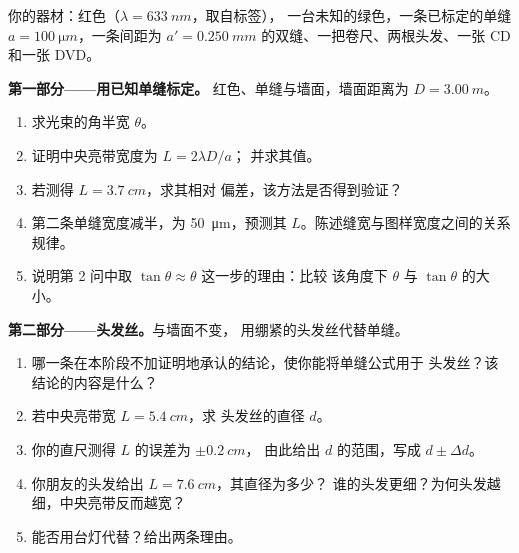 \begin{problem}
\label{pb:g12:light-as-wave:1}
你的器材：红色（$\lambda = \qty{633}{nm}$，取自标签），
一台未知的绿色，一条已标定的单缝
$a = \qty{100}{\micro m}$，一条间距为 $a' =
\qty{0.250}{mm}$ 的双缝、一把卷尺、两根头发、一张 CD 和一张 DVD。

\medskip
\noindent\textbf{第一部分——用已知单缝标定。}
红色、单缝与墙面，墙面距离为 $D = \qty{3.00}{m}$。
\begin{enumerate}
  \item 求光束的角半宽 $\theta$。
  \item 证明中央亮带宽度为 $L = 2\lambda D/a$；
        并求其值。
  \item 若测得 $L = \qty{3.7}{cm}$，求其相对
        偏差，该方法是否得到验证？
  \item 第二条单缝宽度减半，为 \qty{50}{\micro m}，预测其
        $L$。陈述缝宽与图样宽度之间的关系规律。
  \item 说明第 2 问中取 $\tan\theta \approx \theta$ 这一步的理由：比较
        该角度下 $\theta$ 与 $\tan\theta$ 的大小。
\end{enumerate}

\medskip
\noindent\textbf{第二部分——头发丝。}与墙面不变，
用绷紧的头发丝代替单缝。
\begin{enumerate}[resume]
  \item 哪一条在本阶段不加证明地承认的结论，使你能将单缝公式用于
        头发丝？该结论的内容是什么？
  \item 若中央亮带宽 $L = \qty{5.4}{cm}$，求
        头发丝的直径 $d$。
  \item 你的直尺测得 $L$ 的误差为 $\pm\qty{0.2}{cm}$，
        由此给出 $d$ 的范围，写成 $d \pm \Delta d$。
  \item 你朋友的头发给出 $L = \qty{7.6}{cm}$，其直径为多少？
        谁的头发更细？为何头发越细，中央亮带反而越宽？
  \item 能否用台灯代替？给出两条理由。
\end{enumerate}


\end{problem}
